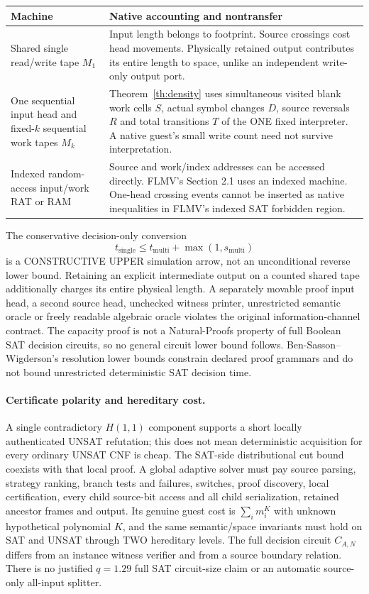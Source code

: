\documentclass[11pt]{article}
\begin{document}
\begin{center}\small\begin{tabularx}{.97\linewidth}{p{.19\linewidth}X}\toprule
Machine & Native accounting and nontransfer\\\midrule
Shared single read/write tape $M_1$ & Input length belongs to footprint. Source crossings cost head movements. Physically retained output contributes its entire length to space, unlike an independent write-only output port.\\
One sequential input head and fixed-$k$ sequential work tapes $M_k$ & Theorem~\ref{th:density} uses simultaneous visited blank work cells $S$, actual symbol changes $D$, source reversals $R$ and total transitions $T$ of the ONE fixed interpreter. A native guest's small write count need not survive interpretation.\\
Indexed random-access input/work RAT or RAM & Source and work/index addresses can be accessed directly. FLMV's Section 2.1 uses an indexed machine. One-head crossing events cannot be inserted as native inequalities in FLMV's indexed SAT forbidden region.\\\bottomrule\end{tabularx}\end{center}

The conservative decision-only conversion
\[
 t_{\mathrm{single}}\le t_{\mathrm{multi}}+\max(1,s_{\mathrm{multi}})
\]
is a CONSTRUCTIVE UPPER simulation arrow, not an unconditional reverse lower bound. Retaining an explicit intermediate output on a counted shared tape additionally charges its entire physical length. A separately movable proof input head, a second source head, unchecked witness printer, unrestricted semantic oracle or freely readable algebraic oracle violates the original information-channel contract. The capacity proof is not a Natural-Proofs property of full Boolean SAT decision circuits, so no general circuit lower bound follows. Ben-Sasson--Wigderson's resolution lower bounds constrain declared proof grammars and do not bound unrestricted deterministic SAT decision time.

\paragraph{Certificate polarity and hereditary cost.}
A single contradictory $H(1,1)$ component supports a short locally authenticated UNSAT refutation; this does not mean deterministic acquisition for every ordinary UNSAT CNF is cheap. The SAT-side distributional cut bound coexists with that local proof. A global adaptive solver must pay source parsing, strategy ranking, branch tests and failures, switches, proof discovery, local certification, every child source-bit access and all child serialization, retained ancestor frames and output. Its genuine guest cost is $\sum_i m_i^K$ with unknown hypothetical polynomial $K$, and the same semantic/space invariants must hold on SAT and UNSAT through TWO hereditary levels. The full decision circuit $C_{A,N}$ differs from an instance witness verifier and from a source boundary relation. There is no justified $q=1.29$ full SAT circuit-size claim or an automatic source-only all-input splitter.
\end{document}
